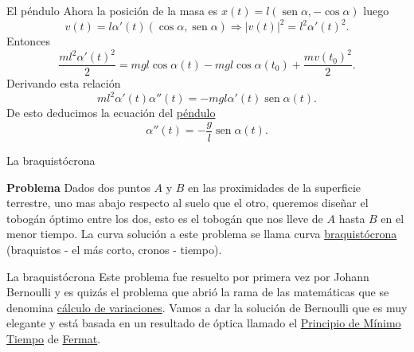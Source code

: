 \documentclass[handout,hyperref={colorlinks=true}]{beamer}
\DeclareMathOperator{\sen}{sen}
\newcommand{\nl}{\onslide<+-> }
\begin{document}
\begin{frame}{El péndulo}
Ahora la posición de la masa es $x(t)=l(\sen\alpha,-\cos\alpha)$ luego 
\[v(t)=l\alpha'(t)(\cos\alpha,\sen\alpha) \Longrightarrow |v(t)|^2=l^2\alpha'(t)^2.\]
Entonces
\[\frac{ml^2\alpha'(t)^2}{2}= mgl\cos\alpha(t)-mgl\cos\alpha(t_0) +\frac{mv(t_0)^2}{2}.\]
Derivando esta relación
\[ml^2\alpha'(t)\alpha''(t)=-mgl\alpha'(t)\sen\alpha(t).\]
De esto deducimos la ecuación del \href{http://es.wikipedia.org/wiki/Péndulo}{péndulo}
\[\boxed{\alpha''(t)=-\frac{g}{l}\sen\alpha(t)}.\]
\end{frame}

\begin{frame}{La braquistócrona}
 
\textbf{Problema} Dados dos puntos $A$ y $B$ en las proximidades de la superficie terrestre, uno mas abajo respecto al suelo que el otro,
queremos diseñar el tobogán óptimo entre los dos, 
esto es el tobogán que nos lleve de $A$ hasta $B$ en el menor tiempo. La curva solución a este problema se llama curva 
\href{http://es.wikipedia.org/wiki/Curva_braquistócrona}{braquistócrona} (braquistos - el más corto, cronos - tiempo). 
 
\begin{center}
\end{center}
\end{frame}

\begin{frame}{La braquistócrona}
\nl Este problema fue resuelto por primera vez por Johann Bernoulli y es quizás el problema  que abrió la rama de las matemáticas que se denomina 
\href{http://es.wikipedia.org/wiki/Cálculo_variacional}{cálculo de 
variaciones}. Vamos a dar la solución de Bernoulli que es muy elegante y está basada en un resultado de óptica llamado 
 el \href{http://es.wikipedia.org/wiki/Principio_de_Fermat}{Principio de Mínimo Tiempo} de \href{http://es.wikipedia.org/wiki/Fermat}{Fermat}.




\end{frame}
\end{document}
